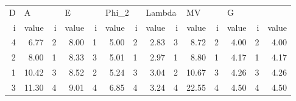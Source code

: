 \begin{tabular}{rrrrrrrrrrrrrr}
\toprule
 D & \multicolumn{2}{l}{A} & \multicolumn{2}{l}{E} & \multicolumn{2}{l}{Phi\_2} & \multicolumn{2}{l}{Lambda} & \multicolumn{2}{l}{MV} & \multicolumn{2}{l}{G} \\
 i &  value &  i & value &  i & value &     i & value &      i &  value &  i & value &  i & value \\
\midrule
 4 &   6.77 &  2 &  8.00 &  1 &  5.00 &     2 &  2.83 &      3 &   8.72 &  2 &  4.00 &  2 &  4.00 \\
 2 &   8.00 &  1 &  8.33 &  3 &  5.01 &     1 &  2.97 &      1 &   8.80 &  1 &  4.17 &  1 &  4.17 \\
 1 &  10.42 &  3 &  8.52 &  2 &  5.24 &     3 &  3.04 &      2 &  10.67 &  3 &  4.26 &  3 &  4.26 \\
 3 &  11.30 &  4 &  9.01 &  4 &  6.85 &     4 &  3.24 &      4 &  22.55 &  4 &  4.50 &  4 &  4.50 \\
\bottomrule
\end{tabular}
